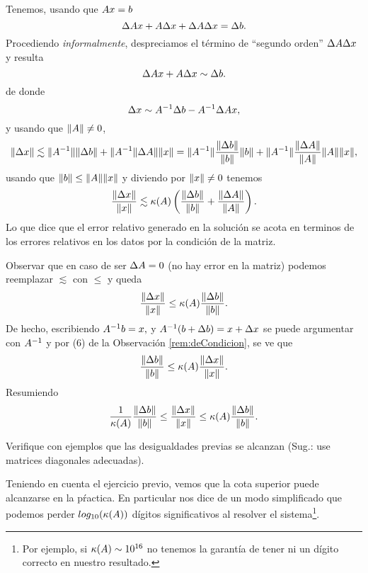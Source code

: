 Tenemos, usando que $\Ab\xb=\bb$
$$
\Delta \Ab\xb+\Ab\Delta\xb+\Delta \Ab\Delta \xb=\Delta \bb.
$$
Procediendo \emph{informalmente}, despreciamos el término de ``segundo orden'' $\Delta \Ab\Delta \xb$ y resulta
$$
\Delta \Ab\xb+\Ab\Delta\xb \sim \Delta \bb.
$$
de donde
$$
\Delta \xb\sim \Ab^{-1}\Delta \bb-\Ab^{-1}\Delta \Ab\xb,
$$
y usando que $\|\Ab\|\neq 0$,
$$
\|\Delta \xb\|\lesssim \|\Ab^{-1}\|\|\Delta \bb\|+\|\Ab^{-1}\|\Delta \Ab\|\|\xb\|=\|\Ab^{-1}\|\frac{\|\Delta \bb\|}{\|\bb\|}\|\bb\|+\|\Ab^{-1}\|\frac{\|\Delta \Ab\|}{\|\Ab\|}\|\Ab\|\|\xb\|,
$$
usando que $\|\bb\|\le \|\Ab\|\|\xb\|$ y diviendo por $\|\xb\|\neq \cero$ tenemos
$$\frac{\|\Delta \xb\|}{\|\xb\|}\lesssim \kappa(\Ab)\left(\frac{\|\Delta \bb\|}{\|\bb\|}+ \frac{\|\Delta \Ab\|}{\|\Ab\|}\right).$$
Lo que dice que el error  relativo generado en la solución  se acota en terminos de los errores relativos en los datos por la condición de la matriz.

Observar que en caso de ser $\Delta \Ab=\cero$ (no hay error en la matriz) podemos reemplazar $\lesssim$ con $\le$ y queda
$$\frac{\|\Delta \xb\|}{\|\xb\|}\le \kappa(\Ab)\frac{\|\Delta \bb\|}{\|\bb\|}.$$
De hecho, escribiendo
$\Ab^{-1}\bb=\xb,$ y $\Ab^{-1}(\bb+\Delta\bb)=\xb+\Delta \xb$ se puede argumentar con $\Ab^{-1}$ y por (6) de la Observación \ref{rem:deCondicion}, se ve que
$$\frac{\|\Delta \bb\|}{\|\bb\|}\le \kappa(\Ab)\frac{\|\Delta \xb\|}{\|\xb\|}.$$
Resumiendo
\tcc
$$\frac{1}{\kappa(\Ab)}\frac{\|\Delta \bb\|}{\|\bb\|}\le \frac{\|\Delta \xb\|}{\|\xb\|}\le \kappa(\Ab)\frac{\|\Delta \bb\|}{\|\bb\|}.$$
\etcc
\begin{ej}
 Verifique con ejemplos que las desigualdades previas se alcanzan (Sug.: use matrices diagonales adecuadas).
\end{ej}
Teniendo en cuenta el ejercicio previo, vemos que la cota superior puede alcanzarse en la pŕactica. En particular nos dice de un modo simplificado que podemos perder $log_{10}(\kappa(\Ab))$ dígitos significativos al resolver el sistema\footnote{Por ejemplo, si $\kappa(\Ab)\sim 10^{16}$ no tenemos la garantía de tener ni un dígito correcto en nuestro resultado.}.

